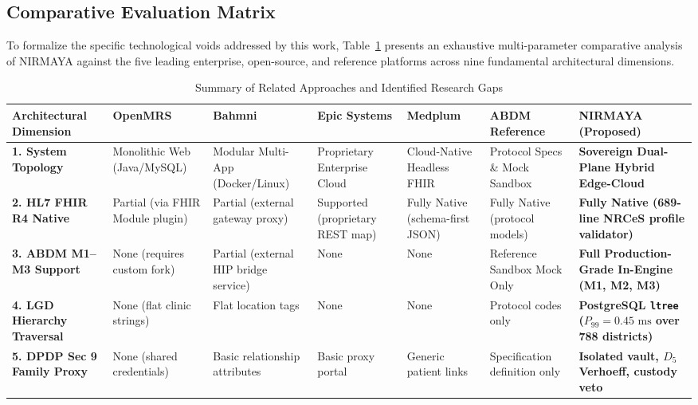 \documentclass[journal,twocolumn]{IEEEtran}
\begin{document}
\subsection{Comparative Evaluation Matrix}
To formalize the specific technological voids addressed by this work, Table~\ref{tab:related_works} presents an exhaustive multi-parameter comparative analysis of NIRMAYA against the five leading enterprise, open-source, and reference platforms across nine fundamental architectural dimensions.

\begin{table}[t]
\centering
\caption{Summary of Related Approaches and Identified Research Gaps}
\label{tab:related_works}
\renewcommand{\arraystretch}{1.25}
\begin{tabularx}{\textwidth}{l X X X X X X}
\toprule
\textbf{Architectural Dimension} & \textbf{OpenMRS} & \textbf{Bahmni} & \textbf{Epic Systems} & \textbf{Medplum} & \textbf{ABDM Reference} & \textbf{NIRMAYA (Proposed)} \\
\midrule
\textbf{1. System Topology} & Monolithic Web (Java/MySQL) & Modular Multi-App (Docker/Linux) & Proprietary Enterprise Cloud & Cloud-Native Headless FHIR & Protocol Specs \& Mock Sandbox & \textbf{Sovereign Dual-Plane Hybrid Edge-Cloud} \\

\textbf{2. HL7 FHIR R4 Native} & Partial (via FHIR Module plugin) & Partial (external gateway proxy) & Supported (proprietary REST map) & Fully Native (schema-first JSON) & Fully Native (protocol models) & \textbf{Fully Native (689-line NRCeS profile validator)} \\

\textbf{3. ABDM M1--M3 Support} & None (requires custom fork) & Partial (external HIP bridge service) & None & None & Reference Sandbox Mock Only & \textbf{Full Production-Grade In-Engine (M1, M2, M3)} \\

\textbf{4. LGD Hierarchy Traversal} & None (flat clinic strings) & Flat location tags & None & None & Protocol codes only & \textbf{PostgreSQL \texttt{ltree} ($P_{99} = 0.45\text{ ms}$ over 788 districts)} \\

\textbf{5. DPDP Sec 9 Family Proxy} & None (shared credentials) & Basic relationship attributes & Basic proxy portal & Generic patient links & Specification definition only & \textbf{Isolated vault, $D_5$ Verhoeff, custody veto} \\


\end{tabularx}
\end{table}
\end{document}
